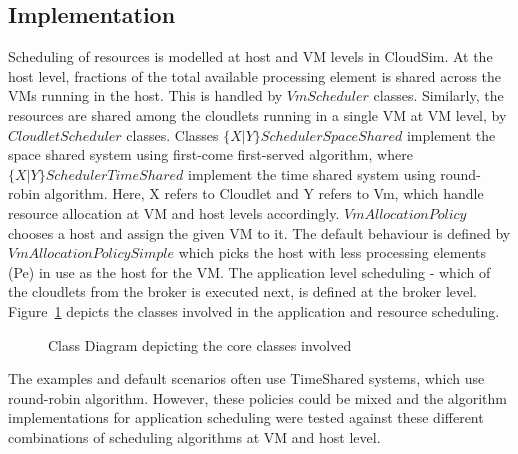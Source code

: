 \documentclass{llncs}
\begin{document}
\subsection{Implementation}
Scheduling of resources is modelled at host and VM levels in CloudSim. At the host level, fractions of the total available processing element is shared across the VMs running in the host. This is handled by $VmScheduler$ classes. Similarly, the resources are shared among the cloudlets running in a single VM at VM level, by $CloudletScheduler$ classes. Classes $\{X|Y\}SchedulerSpaceShared$ implement the space shared system using first-come first-served algorithm, where $\{X|Y\}SchedulerTimeShared$ implement the time shared system using round-robin algorithm. Here, X refers to Cloudlet and Y refers to Vm, which handle resource allocation at VM and host levels accordingly. $VmAllocationPolicy$ chooses a host and assign the given VM to it. The default behaviour is defined by $VmAllocationPolicySimple$ which picks the host with less processing elements (Pe) in use as the host for the VM. The application level scheduling - which of the cloudlets from the broker is executed next, is defined at the broker level. Figure~\ref{fig:classdiagram} depicts the classes involved in the application and resource scheduling.
\begin{figure}[ht]
 \caption{Class Diagram depicting the core classes involved}
 \label{fig:classdiagram}
\end{figure}

The examples and default scenarios often use TimeShared systems, which use round-robin algorithm. However, these policies could be mixed and the algorithm implementations for application scheduling were tested against these different combinations of scheduling algorithms at VM and host level.
\end{document}
